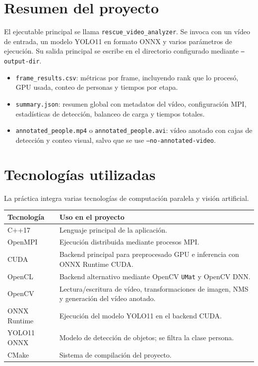 \documentclass[12pt,a4paper]{article}
\begin{document}
\section{Resumen del proyecto}

El ejecutable principal se llama \texttt{rescue\_video\_analyzer}. Se invoca con un v\'ideo de
entrada, un modelo YOLO11 en formato ONNX y varios par\'ametros de ejecuci\'on. Su salida
principal se escribe en el directorio configurado mediante \texttt{--output-dir}.

\begin{itemize}
    \item \texttt{frame\_results.csv}: m\'etricas por frame, incluyendo rank que lo proces\'o,
    GPU usada, conteo de personas y tiempos por etapa.
    \item \texttt{summary.json}: resumen global con metadatos del v\'ideo, configuraci\'on MPI,
    estad\'isticas de detecci\'on, balanceo de carga y tiempos totales.
    \item \texttt{annotated\_people.mp4} o \texttt{annotated\_people.avi}: v\'ideo anotado con
    cajas de detecci\'on y conteo visual, salvo que se use \texttt{--no-annotated-video}.
\end{itemize}

\section{Tecnolog\'ias utilizadas}

La pr\'actica integra varias tecnolog\'ias de computaci\'on paralela y visi\'on artificial.

\begin{longtable}{p{}p{}}
\toprule
\textbf{Tecnolog\'ia} & \textbf{Uso en el proyecto} \\
\midrule
C++17 & Lenguaje principal de la aplicaci\'on. \\
OpenMPI & Ejecuci\'on distribuida mediante procesos MPI. \\
CUDA & Backend principal para preprocesado GPU e inferencia con ONNX Runtime CUDA. \\
OpenCL & Backend alternativo mediante OpenCV \texttt{UMat} y OpenCV DNN. \\
OpenCV & Lectura/escritura de v\'ideo, transformaciones de imagen, NMS y generaci\'on del v\'ideo anotado. \\
ONNX Runtime & Ejecuci\'on del modelo YOLO11 en el backend CUDA. \\
YOLO11 ONNX & Modelo de detecci\'on de objetos; se filtra la clase persona. \\
CMake & Sistema de compilaci\'on del proyecto. \\
\bottomrule
\end{longtable}
\end{document}

